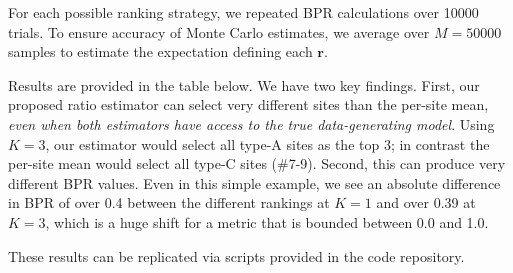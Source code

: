 For each possible ranking strategy, we repeated BPR calculations over 10000 trials. 
To ensure accuracy of Monte Carlo estimates, we average over $M=50000$ samples to estimate the expectation defining each $\bm{r}$.

Results are provided in the table below. We have two key findings. First, our proposed ratio estimator can select very different sites than the per-site mean, \emph{even when both estimators have access to the true data-generating model}. Using $K=3$, our estimator would select all type-A sites as the top 3; in contrast the per-site mean would select all type-C sites (\#7-9). Second, this can produce very different BPR values. Even in this simple example, we see an absolute difference in BPR of over 0.4 between the different rankings at $K=1$ and over 0.39 at $K=3$, which is a huge shift for a metric that is bounded between 0.0 and 1.0.

\noindent{}

These results can be replicated via scripts provided in the code repository.